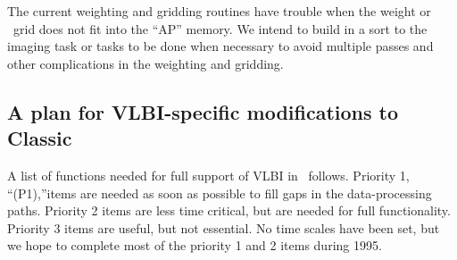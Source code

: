 The current weighting and gridding routines have trouble when the
weight or \uv\ grid does not fit into the ``AP'' memory.  We intend to
build in a sort to the imaging task or tasks to be done when necessary
to avoid multiple passes and other complications in the weighting and
gridding.

\subsection{A plan for VLBI-specific modifications to Classic \AIPS}

A list of functions needed for full support of VLBI in \AIPS\ follows.
Priority 1, ``(P1),''items are needed as soon as possible to fill gaps
in the data-processing paths.  Priority 2 items are less time
critical, but are needed for full functionality.  Priority 3 items are
useful, but not essential.  No time scales have been set, but we hope
to complete most of the priority 1 and 2 items during 1995.

